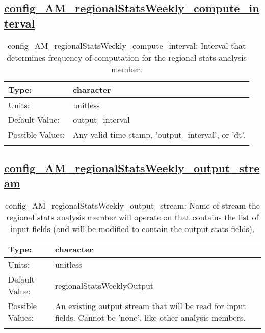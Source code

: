 \subsection[config\_AM\_regionalStatsWeekly\_compute\_interval]{\hyperref[sec:nm_tab_AM_regionalStatsWeekly]{config\_AM\_regionalStatsWeekly\_compute\_interval}}
\label{subsec:nm_sec_config_AM_regionalStatsWeekly_compute_interval}
\begin{center}
\begin{longtable}{| p{2.0in} || p{4.0in} |}
    \hline
    Type: & character \\
    \hline
    Units: & \si{unitless} \\
    \hline
    Default Value: & output\_interval \\
    \hline
    Possible Values: & Any valid time stamp, 'output\_interval', or 'dt'. \\
    \hline
    \caption{config\_AM\_regionalStatsWeekly\_compute\_interval: Interval that determines frequency of computation for the regional stats analysis member.}
\end{longtable}
\end{center}
\subsection[config\_AM\_regionalStatsWeekly\_output\_stream]{\hyperref[sec:nm_tab_AM_regionalStatsWeekly]{config\_AM\_regionalStatsWeekly\_output\_stream}}
\label{subsec:nm_sec_config_AM_regionalStatsWeekly_output_stream}
\begin{center}
\begin{longtable}{| p{2.0in} || p{4.0in} |}
    \hline
    Type: & character \\
    \hline
    Units: & \si{unitless} \\
    \hline
    Default Value: & regionalStatsWeeklyOutput \\
    \hline
    Possible Values: & An existing output stream that will be read for input fields. Cannot be 'none', like other analysis members. \\
    \hline
    \caption{config\_AM\_regionalStatsWeekly\_output\_stream: Name of stream the regional stats analysis member will operate on that contains the list of input fields (and will be modified to contain the output stats fields).}
\end{longtable}
\end{center}
